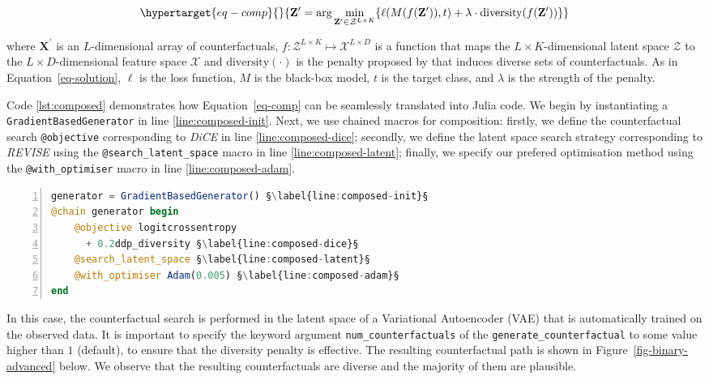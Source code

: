 \documentclass{juliacon}
\begin{document}
\begin{equation}\protect\hypertarget{eq-comp}{}{
\mathbf{Z}^\prime = \arg \min_{\mathbf{Z}^\prime \in \mathcal{Z}^{L \times K}} \{  {\ell(M(f(\mathbf{Z}^\prime)),t)} + \lambda \cdot {\text{diversity}(f(\mathbf{Z}^\prime)) }  \} 
}\label{eq-comp}\end{equation}

where \(\mathbf{X}^\prime\) is an \(L\)-dimensional array of
counterfactuals,
\(f: \mathcal{Z}^{L \times K} \mapsto \mathcal{X}^{L \times D}\) is a
function that maps the \(L \times K\)-dimensional latent space
\(\mathcal{Z}\) to the \(L \times D\)-dimensional feature space
\(\mathcal{X}\) and \(\text{diversity}(\cdot)\) is the penalty proposed
by \textcite{mothilal2020explaining} that induces diverse sets of
counterfactuals. As in Equation~\ref{eq-solution}, \(\ell\) is the loss
function, \(M\) is the black-box model, \(t\) is the target class, and
\(\lambda\) is the strength of the penalty.

Code \ref{lst:composed} demonstrates how Equation~\ref{eq-comp} can be
seamlessly translated into Julia code. We begin by instantiating a
\texttt{GradientBasedGenerator} in line \ref{line:composed-init}. Next,
we use chained macros for composition: firstly, we define the
counterfactual search \texttt{@objective} corresponding to \emph{DiCE}
in line \ref{line:composed-dice}; secondly, we define the latent space
search strategy corresponding to \emph{REVISE} using the
\texttt{@search\_latent\_space} macro in line
\ref{line:composed-latent}; finally, we specify our prefered
optimisation method using the \texttt{@with\_optimiser} macro in line
\ref{line:composed-adam}.

\begin{lstlisting}[language=Julia, escapechar=§, numbers=left, label={lst:composed}, caption={Composing a custom generator.}]
generator = GradientBasedGenerator() §\label{line:composed-init}§
@chain generator begin
    @objective logitcrossentropy 
      + 0.2ddp_diversity §\label{line:composed-dice}§
    @search_latent_space §\label{line:composed-latent}§
    @with_optimiser Adam(0.005) §\label{line:composed-adam}§
end
\end{lstlisting}

In this case, the counterfactual search is performed in the latent space
of a Variational Autoencoder (VAE) that is automatically trained on the
observed data. It is important to specify the keyword argument
\texttt{num\_counterfactuals} of the \texttt{generate\_counterfactual}
to some value higher than \(1\) (default), to ensure that the diversity
penalty is effective. The resulting counterfactual path is shown in
Figure~\ref{fig-binary-advanced} below. We observe that the resulting
counterfactuals are diverse and the majority of them are plausible.
\end{document}
